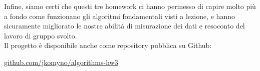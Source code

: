\noindent Infine, siamo certi che questi tre homework ci hanno permesso di capire molto più a fondo come funzionano gli algoritmi fondamentali visti a lezione, e hanno sicuramente migliorato le nostre abilità di misurazione dei dati e resoconto del lavoro di gruppo svolto. \\

\noindent Il progetto è disponibile anche come repository pubblica su Github:

\begin{center}
\href{https://github.com/jkomyno/algorithms-hw3}{github.com/jkomyno/algorithms-hw3}
\end{center}
